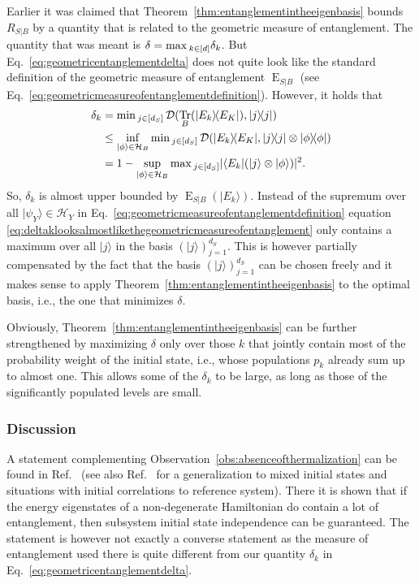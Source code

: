 \documentclass[a4paper,12pt,listof=totoc,index=totoc,bibliography=totoc,headsepline=false,headings=normal,BCOR16.153846mm,DIV12,headinclude,twoside,cleardoublepage=empty,numbers=noenddot,final]{scrreprt}
\theoremstyle{mystyle}
\numberwithin{equation}{section}
\numberwithin{figure}{section}
\numberwithin{lemma}{section}
\numberwithin{theorem}{section}
\numberwithin{corollary}{section}
\numberwithin{definition}{section}
\numberwithin{conjecture}{section}
\numberwithin{observation}{section}
\newcommand{\+}{\mkern2mu}
\newcommand{\texteqref}[1]{Eq.~\eqref{#1}}
\renewcommand{\max}{\mathchoice{\operatorname*{max}}{\operatorname*{max}}{\mathrm{max}}{\mathrm{max}}} %
\renewcommand{\min}{\mathchoice{\operatorname*{min}}{\operatorname*{min}}{\mathrm{min}}{\mathrm{min}}}
\newcommand{\bra}[1]{\langle #1|}
\newcommand{\ket}[1]{|#1\rangle}
\newcommand{\ketbra}[2]{\ket{#1}\!\bra{#2}}
\newcommand{\tracedistance}[3][]{
  \ifthenelse{\equal{#2}{}}
  {\ifthenelse{\equal{#3}{}}
    {\mathcal{D}_{#1}}{}
  }{
    \ifthenelse{\equal{#1}{}}
    {\operatorname{\mathcal{D}}(#2,#3)}
    {\operatorname{\mathcal{D}}_{#1}(#2,#3)}
  }
}
\DeclareMathOperator{\geometricentanglement}{E}
\DeclareMathOperator{\1}{\mathds{1}}
\DeclareMathOperator{\Tr}{Tr}
\newcommand{\mc}[1]{\mathcal{#1}}
\newcommand{\mcH}{\mc{H}}
\begin{document}
Earlier it was claimed that Theorem~\ref{thm:entanglementintheeigenbasis} bounds $R_{S|B}$ by a quantity that is related to the geometric measure of entanglement.
The quantity that was meant is $\delta = \max_{k\in[d]} \delta_k$.
But \texteqref{eq:geometricentanglementdelta} does not quite look like the standard definition of the geometric measure of entanglement $\geometricentanglement_{S|B}$ (see \texteqref{eq:geometricmeasureofentanglementdefinition}).
However, it holds that \cite[Chapter 9.2]{nielsenchuang}
\begin{align}
  \delta_k &= \min_{j\in [d_S]} \tracedistance{\Tr_B(\ketbra{E_k}{E_K})}{\ketbra j j} \\
  &\leq \inf_{\ket\phi \in \mcH_B} \min_{j\in [d_S]} \tracedistance{\ketbra{E_k}{E_K}}{\ketbra j j \otimes \ketbra\phi\phi} \\
  &= 1 - \sup_{\ket\phi \in \mcH_B} \max_{j\in [d_S]} | \bra{E_k} (\ket j \otimes \ket\phi) |^2 . \label{eq:deltaklooksalmostlikethegeometricmeasureofentanglement}
\end{align}
So, $\delta_k$ is almost upper bounded by $\geometricentanglement_{S|B}(\ket{E_k})$.
Instead of the supremum over all $\ket{\psi_Y} \in \mcH_Y$ in \texteqref{eq:geometricmeasureofentanglementdefinition} equation \eqref{eq:deltaklooksalmostlikethegeometricmeasureofentanglement} only contains a maximum over all $\ket j$ in the basis $(\ket j)_{j=1}^{d_S}$.
This is however partially compensated by the fact that the basis $(\ket j)_{j=1}^{d_S}$ can be chosen freely and it makes sense to apply Theorem~\ref{thm:entanglementintheeigenbasis} to the optimal basis, i.e., the one that minimizes $\delta$.

Obviously, Theorem~\ref{thm:entanglementintheeigenbasis} can be further strengthened by maximizing $\delta$ only over those $k$ that jointly contain most of the probability weight of the initial state, i.e., whose populations $p_k$ already sum up to almost one.
This allows some of the $\delta_k$ to be large, as long as those of the significantly populated levels are small.

\subsubsection*{Discussion}
%
A statement complementing Observation~\ref{obs:absenceofthermalization} can be found in Ref.~\cite[Section B]{Linden09} (see also Ref.~\cite{MasterThesisHutter} for a generalization to mixed initial states and situations with initial correlations to reference system).
There it is shown that if the energy eigenstates of a non-degenerate Hamiltonian do contain a lot of entanglement, then subsystem initial state independence can be guaranteed.
The statement is however not exactly a converse statement as the measure of entanglement used there is quite different from our quantity $\delta_k$ in \texteqref{eq:geometricentanglementdelta}.
\end{document}
